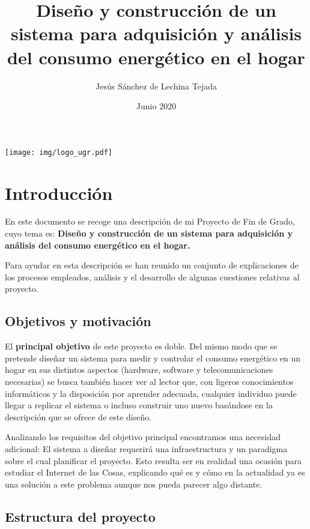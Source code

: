 \documentclass[a4paper,10pt]{article}
\title{Diseño y construcción de un sistema para adquisición y análisis
  del consumo energético en el hogar}
\author{Jesús Sánchez de Lechina Tejada}
\date{Junio 2020}
\begin{document}
\maketitle
\thispagestyle{empty}
\begin{center}
  \texttt{[image: img/logo\_ugr.pdf]}
\end{center}

\newpage

\tableofcontents

\fontsize{10}{12}\selectfont

\newpage

\section{Introducción}\label{intro}

En este documento se recoge una descripción de mi Proyecto de Fin de
Grado, cuyo tema es: \textbf{Diseño y construcción de un sistema para
  adquisición y análisis del consumo energético en el hogar.}

Para ayudar en esta descripción se han reunido un conjunto de
explicaciones de los procesos empleados, análisis y el desarrollo de
algunas cuestiones relativas al proyecto.

\subsection{Objetivos y motivación}\label{objetivos}

El \textbf{principal objetivo} de este proyecto es doble. Del mismo modo que se
pretende diseñar un sistema para medir y controlar el consumo
energético en un hogar en sus distintos aspectos (hardware, software y
telecomunicaciones necesarias) se busca también hacer ver al lector
que, con ligeros conocimientos informáticos y la disposición por
aprender adecuada, cualquier individuo puede llegar a replicar el
sistema o incluso construir uno nuevo basándose en la descripción que
se ofrece de este diseño.

Analizando los requisitos del objetivo principal encontramos una
necesidad adicional: El sistema a diseñar requerirá una
infraestructura y un paradigma sobre el cual planificar el
proyecto. Esto resulta ser en realidad una ocasión para estudiar el
Internet de las Cosas, explicando qué es y cómo en la actualidad ya es
una solución a este problema aunque nos pueda parecer algo distante.

\subsection{Estructura del proyecto}\label{estructura}
\end{document}
